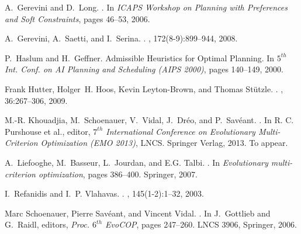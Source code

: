 \documentclass[letterpaper]{article}
\begin{document}
\begin{thebibliography}{}
A.~Gerevini and D.~Long.
.
\newblock In {\em ICAPS Workshop on Planning with Preferences and Soft
  Constraints}, pages 46--53, 2006.

A.~Gerevini, A.~Saetti, and I.~Serina.
.
, 172(8-9):899--944, 2008.

P.~Haslum and H.~Geffner.
\newblock Admissible {H}euristics for {O}ptimal {P}lanning.
\newblock In {\em $5^{th}$ Int. Conf. on AI Planning and Scheduling (AIPS
  2000)}, pages 140--149, 2000.

Frank Hutter, Holger~H. Hoos, Kevin Leyton-Brown, and Thomas St\"{u}tzle.
.
, 36:267--306, 2009.

M.-R. Khouadjia, M.~Schoenauer, V.~Vidal, J.~Dr\'eo, and P.~Sav\'eant.
.
\newblock In {R. C. Purshouse et al.}, editor, {\em $7^{th}$ International
  Conference on Evolutionary Multi-Criterion Optimization (EMO 2013)}, LNCS.
  Springer Verlag, 2013.
\newblock To appear.

A.~Liefooghe, M.~Basseur, L.~Jourdan, and E.G. Talbi.
.
\newblock In {\em Evolutionary multi-criterion optimization}, pages 386--400.
  Springer, 2007.

I.~Refanidis and I.~P. Vlahavas.
.
, 145(1-2):1--32, 2003.

Marc Schoenauer, Pierre Sav{\'e}ant, and Vincent Vidal.
.
\newblock In J.~Gottlieb and G.~Raidl, editors, {\em Proc. $6^{th}$ EvoCOP},
  pages 247--260. LNCS 3906, Springer, 2006.


\end{thebibliography}
\end{document}
